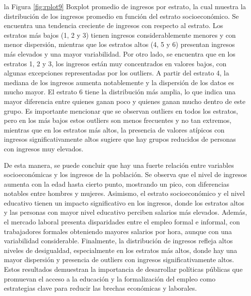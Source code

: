\documentclass[12pt,a4paper,onecolumn]{article}
\begin{document}
\begin{enumerate}
\begin{enumerate}
la Figura \ref{fig:rplot9} Boxplot promedio de ingresos por estrato, la cual muestra la distribuci\'on de los ingresos promedio en funci\'on del estrato socioecon\'omico. Se encuentra una tendencia creciente de ingresos con respecto al estrato. Los estratos m\'as bajos (1, 2 y 3) tienen ingresos considerablemente menores y con menor dispersi\'on, mientras que los estratos altos (4, 5 y 6) presentan ingresos m\'as elevados y una mayor variabilidad. Por otro lado, se encuentra que en los estratos 1, 2 y 3, los ingresos est\'an muy concentrados en valores bajos, con algunas excepciones representadas por los outliers. A partir del estrato 4, la mediana de los ingresos aumenta notablemente y la dispersi\'on de los datos es mucho mayor. El estrato 6 tiene la distribuci\'on m\'as amplia, lo que indica una mayor diferencia entre quienes ganan poco y quienes ganan mucho dentro de este grupo. Es importante mencionar que se observan outliers en todos los estratos, pero en los m\'as bajos estos outliers son menos frecuentes y no tan extremos, mientras que en los estratos m\'as altos, la presencia de valores at\'ipicos con ingresos significativamente altos sugiere que hay grupos reducidos de personas con ingresos muy elevados. 

De esta manera, se puede concluir que hay una fuerte relaci\'on entre variables socioecon\'omicas y los ingresos de la poblaci\'on. Se observa que el nivel de ingresos aumenta con la edad hasta cierto punto, mostrando un pico, con diferencias notables entre hombres y mujeres. Asimismo, el estrato socioecon\'omico y el nivel educativo tienen un impacto significativo en los ingresos, donde los estratos altos y las personas con mayor nivel educativo perciben salarios más elevados. Adem\'as, el mercado laboral presenta disparidades entre el empleo formal e informal, con trabajadores formales obteniendo mayores salarios por hora, aunque con una variabilidad considerable. Finalmente, la distribuci\'on de ingresos refleja altos niveles de desigualdad, especialmente en los estratos m\'as altos, donde hay una mayor dispersi\'on y presencia de outliers con ingresos significativamente altos. Estos resultados demuestran la importancia de desarrollar políticas p\'ublicas que promuevan el acceso a la educaci\'on y la formalizaci\'on del empleo como estrategias clave para reducir las brechas econ\'omicas y laborales.







    


\end{enumerate}
\end{enumerate}
\end{document}
